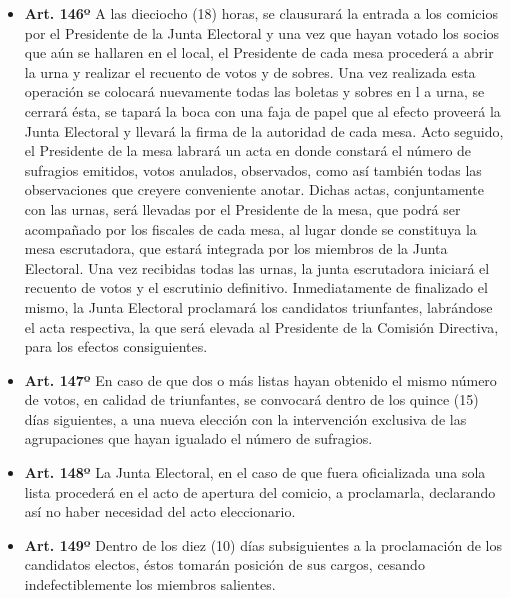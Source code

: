 \documentclass[]{book}
\providecommand{\tightlist}{%
  \setlength{\itemsep}{0pt}\setlength{\parskip}{0pt}}
\begin{document}
\begin{itemize}
\tightlist
\item
  \textbf{Art. 146º} A las dieciocho (18) horas, se clausurará la
  entrada a los comicios por el Presidente de la Junta Electoral y una
  vez que hayan votado los socios que aún se hallaren en el local, el
  Presidente de cada mesa procederá a abrir la urna y realizar el
  recuento de votos y de sobres. Una vez realizada esta operación se
  colocará nuevamente todas las boletas y sobres en l a urna, se cerrará
  ésta, se tapará la boca con una faja de papel que al efecto proveerá
  la Junta Electoral y llevará la firma de la autoridad de cada mesa.
  Acto seguido, el Presidente de la mesa labrará un acta en donde
  constará el número de sufragios emitidos, votos anulados, observados,
  como así también todas las observaciones que creyere conveniente
  anotar. Dichas actas, conjuntamente con las urnas, será llevadas por
  el Presidente de la mesa, que podrá ser acompañado por los fiscales de
  cada mesa, al lugar donde se constituya la mesa escrutadora, que
  estará integrada por los miembros de la Junta Electoral. Una vez
  recibidas todas las urnas, la junta escrutadora iniciará el recuento
  de votos y el escrutinio definitivo. Inmediatamente de finalizado el
  mismo, la Junta Electoral proclamará los candidatos triunfantes,
  labrándose el acta respectiva, la que será elevada al Presidente de la
  Comisión Directiva, para los efectos consiguientes.
\end{itemize}

\begin{itemize}
\tightlist
\item
  \textbf{Art. 147º} En caso de que dos o más listas hayan obtenido el
  mismo número de votos, en calidad de triunfantes, se convocará dentro
  de los quince (15) días siguientes, a una nueva elección con la
  intervención exclusiva de las agrupaciones que hayan igualado el
  número de sufragios.
\end{itemize}

\begin{itemize}
\tightlist
\item
  \textbf{Art. 148º} La Junta Electoral, en el caso de que fuera
  oficializada una sola lista procederá en el acto de apertura del
  comicio, a proclamarla, declarando así no haber necesidad del acto
  eleccionario.
\end{itemize}

\begin{itemize}
\tightlist
\item
  \textbf{Art. 149º} Dentro de los diez (10) días subsiguientes a la
  proclamación de los candidatos electos, éstos tomarán posición de sus
  cargos, cesando indefectiblemente los miembros salientes.
\end{itemize}
\end{document}

